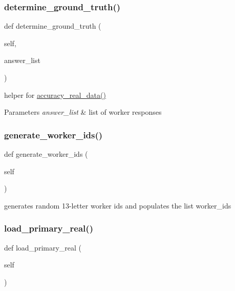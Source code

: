 \subsubsection{\texorpdfstring{determine\_ground\_truth()}{determine\_ground\_truth()}}
{\footnotesize\ttfamily def determine\+\_\+ground\+\_\+truth (\begin{DoxyParamCaption}\item[{}]{self,  }\item[{}]{answer\+\_\+list }\end{DoxyParamCaption})}



helper for \mbox{\hyperlink{classjoinapp_1_1join__simulations_1_1_join_simulation_a687be0f78243c2019ef987b356d469a4}{accuracy\+\_\+real\+\_\+data()}} 


\begin{DoxyParams}{Parameters}
{\em answer\+\_\+list} & list of worker responses \\
\hline
\end{DoxyParams}
\mbox{\label{classjoinapp_1_1join__simulations_1_1_join_simulation_ab955f49a4963d78e2bfe7b811a6b4385}} 
\subsubsection{\texorpdfstring{generate\_worker\_ids()}{generate\_worker\_ids()}}
{\footnotesize\ttfamily def generate\+\_\+worker\+\_\+ids (\begin{DoxyParamCaption}\item[{}]{self }\end{DoxyParamCaption})}



generates random 13-\/letter worker ids and populates the list worker\+\_\+ids 

\mbox{\label{classjoinapp_1_1join__simulations_1_1_join_simulation_a4064c1b101ce0d676fc7fb69ace4e255}} 
\subsubsection{\texorpdfstring{load\_primary\_real()}{load\_primary\_real()}}
{\footnotesize\ttfamily def load\+\_\+primary\+\_\+real (\begin{DoxyParamCaption}\item[{}]{self }\end{DoxyParamCaption})}



